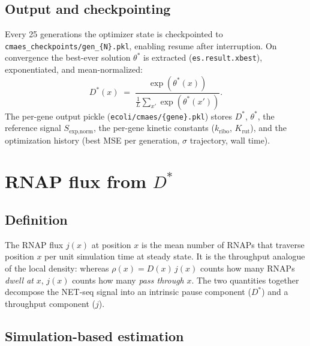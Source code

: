 \documentclass[11pt]{article}
\newcommand{\Krut}{K_{\text{rut}}}
\newcommand{\kribo}{k_{\text{ribo}}}
\begin{document}
\subsection{Output and checkpointing}

Every 25 generations the optimizer state is checkpointed to
\texttt{cmaes\_checkpoints/gen\_\{N\}.pkl}, enabling resume after interruption.
On convergence the best-ever solution $\theta^*$ is extracted (\texttt{es.result.xbest}),
exponentiated, and mean-normalized:
\begin{equation}
  D^*(x) \;=\; \frac{\exp(\theta^*(x))}{\frac{1}{L}\sum_{x'}\exp(\theta^*(x'))}.
\end{equation}
The per-gene output pickle (\texttt{ecoli/cmaes/\{gene\}.pkl}) stores
$D^*$, $\theta^*$, the reference signal $S_{\text{exp,norm}}$, the per-gene
kinetic constants ($\kribo$, $\Krut$), and the optimization history
(best MSE per generation, $\sigma$ trajectory, wall time).

\section{RNAP flux from $D^*$}
\label{sec:flux}

\subsection{Definition}

The RNAP flux $j(x)$ at position $x$ is the mean number of RNAPs that
traverse position $x$ per unit simulation time at steady state. It is
the throughput analogue of the local density: whereas
$\rho(x) = D(x)\,j(x)$ counts how many RNAPs \emph{dwell at} $x$, $j(x)$
counts how many \emph{pass through} $x$. The two quantities together
decompose the NET-seq signal into an intrinsic pause component ($D^*$)
and a throughput component ($j$).

\subsection{Simulation-based estimation}
\end{document}
